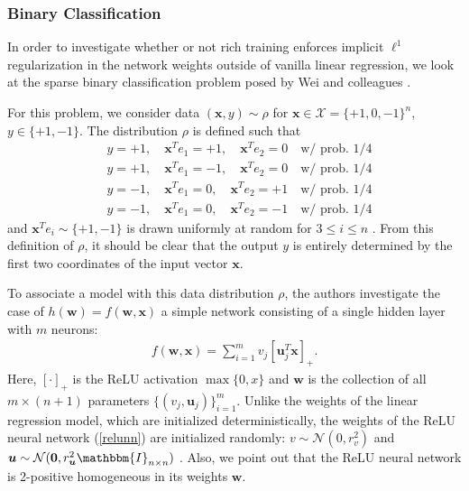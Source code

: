 \documentclass{article}
\begin{document}
\subsubsection{Binary Classification}

In order to investigate whether or not rich training enforces implicit $\ell^1$ regularization in the network weights outside of vanilla linear regression, we look at the sparse binary classification problem posed by Wei and colleagues \cite{wei2019regularization}. 

For this problem, we consider data $(\boldsymbol{x}, y) \sim \rho$ for $\boldsymbol{x} \in \mathcal{X} = \{ +1, 0, -1 \}^n$, $y \in \{+1, -1\}$. The distribution $\rho$ is defined such that 
\begin{align*}
    &y = +1, \quad \boldsymbol{x}^Te_1 = +1, \quad \boldsymbol{x}^Te_2 = 0 \quad \text{w/ prob. 1/4}\\
    &y = +1, \quad \boldsymbol{x}^Te_1 = -1, \quad \boldsymbol{x}^Te_2 = 0 \quad \text{w/ prob. 1/4}\\
    &y = -1, \quad \boldsymbol{x}^Te_1 = 0, \quad \boldsymbol{x}^Te_2 = +1 \quad \text{w/ prob. 1/4}\\
    &y = -1, \quad \boldsymbol{x}^Te_1 = 0, \quad \boldsymbol{x}^Te_2 = -1 \quad \text{w/ prob. 1/4}
\end{align*}
and $\boldsymbol{x}^Te_i \sim \{+1, -1 \}$ is drawn uniformly at random for $3 \leq i \leq n$ \cite{wei2019regularization}. From this definition of $\rho$, it should be clear that the output $y$ is entirely determined by the first two coordinates of the input vector $\boldsymbol{x}$.

To associate a model with this data distribution $\rho$, the authors investigate the case of $h(\boldsymbol{w}) = f(\boldsymbol{w}, \boldsymbol{x})$ a simple network consisting of a single hidden layer with $m$ neurons:
\begin{align}\label{relunn}
    f(\boldsymbol{w}, \boldsymbol{x}) = \sum_{i=1}^m v_j[\boldsymbol{u}_j^T\boldsymbol{x}]_+.
\end{align}
Here, $[\cdot]_+$ is the ReLU activation $\max\{0, x \}$ and $\boldsymbol{w}$ is the collection of all $m \times (n+1)$ parameters $\{ (v_j, \boldsymbol{u}_j) \}_{i=1}^m$. Unlike the weights of the linear regression model, which are initialized deterministically, the weights of the ReLU neural network (\ref{relunn}) are initialized randomly: $v \sim \mathcal{N}(0, r_v^2)$ and $\boldsymbol{u} \sim \mathcal{N}(\boldsymbol{0}, r_{\boldsymbol{u}}^2\mathbbm{I}_{n \times n})$ \cite{wei2019regularization}. Also, we point out that the ReLU neural network is 2-positive homogeneous in its weights $\boldsymbol{w}$. 
\end{document}
